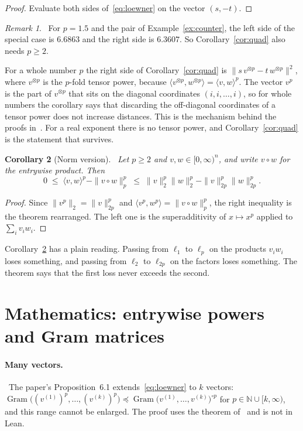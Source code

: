\documentclass[11pt]{article}
\newtheorem{corollary}{Corollary}[section]
\theoremstyle{remark}
\newtheorem{remark}[corollary]{Remark}
\newcommand{\N}{\mathbb{N}}
\newcommand{\ip}[2]{\langle #1,#2\rangle}
\DeclareMathOperator{\Gram}{Gram}
\newcommand{\claimtag}[2]{\tcbox[on line,boxsep=1pt,left=3pt,right=3pt,top=0pt,bottom=0pt,colback=#1!10,colframe=#1!70,boxrule=0.4pt,arc=1.5pt]{\sffamily\scriptsize\bfseries\color{#1}#2}}
\newcommand{\context}{\claimtag{navy}{CONTEXT}}
\newcommand{\consequence}{\claimtag{ForestGreen}{PROVED HERE}}
\begin{document}
\begin{proof}
Evaluate both sides of~\eqref{eq:loewner} on the vector $(s,-t)$.
\end{proof}

\begin{remark}\label{rem:fail21}
\consequence\ For $p=1.5$ and the pair of Example~\ref{ex:counter}, the left side of the special case is $6.6863$ and the right side is $6.3607$. So Corollary~\ref{cor:quad} also needs $p\ge2$.
\end{remark}

For a whole number $p$ the right side of Corollary~\ref{cor:quad} is $\|s\,v^{\otimes p}-t\,w^{\otimes p}\|^2$, where $v^{\otimes p}$ is the $p$-fold tensor power, because $\ip{v^{\otimes p}}{w^{\otimes p}}=\ip vw^p$. The vector $v^p$ is the part of $v^{\otimes p}$ that sits on the diagonal coordinates $(i,i,\dots,i)$, so for whole numbers the corollary says that discarding the off-diagonal coordinates of a tensor power does not increase distances. This is the mechanism behind the proofs in~\cite{JPTV}. For a real exponent there is no tensor power, and Corollary~\ref{cor:quad} is the statement that survives.

\begin{corollary}[Norm version]\label{cor:norms}
\consequence\ Let $p\ge2$ and $v,w\in[0,\infty)^n$, and write $v\circ w$ for the entrywise product. Then
\[
0\;\le\;\ip vw^p-\|v\circ w\|_p^p\;\le\;\|v\|_2^p\|w\|_2^p-\|v\|_{2p}^p\|w\|_{2p}^p .
\]
\end{corollary}

\begin{proof}
Since $\|v^p\|_2=\|v\|_{2p}^p$ and $\ip{v^p}{w^p}=\|v\circ w\|_p^p$, the right inequality is the theorem rearranged. The left one is the superadditivity of $x\mapsto x^p$ applied to $\sum_iv_iw_i$.
\end{proof}

Corollary~\ref{cor:norms} has a plain reading. Passing from $\ell_1$ to $\ell_p$ on the products $v_iw_i$ loses something, and passing from $\ell_2$ to $\ell_{2p}$ on the factors loses something. The theorem says that the first loss never exceeds the second.

\section{Mathematics: entrywise powers and Gram matrices}\label{sec:math}

\paragraph{Many vectors.} \context\ The paper's Proposition~6.1 extends~\eqref{eq:loewner} to $k$ vectors: $\Gram\bigl((v^{(1)})^p,\dots,(v^{(k)})^p\bigr)\preceq\Gram\bigl(v^{(1)},\dots,v^{(k)}\bigr)^{\circ p}$ for $p\in\N\cup[k,\infty)$, and this range cannot be enlarged. The proof uses the theorem of~\cite{GKR15} and is not in Lean.
\end{document}
